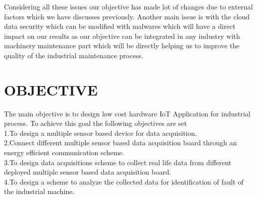 Considering all these issues our objective has made lot of changes due to external factors which we have discusses previously. Another main issue is with the cloud data security which can be modified with malwares which will have a direct impact on our results as our objective can be integrated in any industry with machinery maintenance part which will be directly helping us to improve the quality of the industrial maintenance process.
\section{OBJECTIVE}
The main objective is to design low cost hardware IoT Application for industrial process.
To achieve this goal the following objectives are set \\
1.To design a multiple sensor based device for data acquisition.\\
2.Connect different multiple sensor based data acquisition board through an energy efficient communication scheme.\\
3.To design data acquisitions scheme to collect real life data from different deployed multiple sensor based data acquisition board.\\
4.To design a scheme to analyze the collected data for identification of fault of the industrial machine.\\
